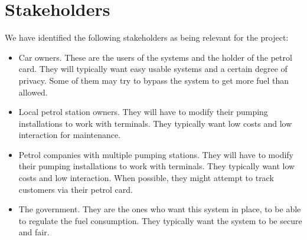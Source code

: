 \section{Stakeholders}
We have identified the following stakeholders as being relevant for the project:
\begin{itemize}
\item Car owners. These are the users of the systems and the holder of the petrol card.
They will typically want easy usable systems and a certain degree of privacy. 
Some of them may try to bypass the system to get more fuel than allowed.

\item Local petrol station owners. They will have to modify their pumping installations to 
work with terminals. They typically want low costs and low interaction for maintenance.

\item Petrol companies with multiple pumping stations. They will have to modify their
pumping installations to work with terminals. They typically want low costs and 
low interaction. When possible, they might attempt to track customers via their petrol card.

\item The government. They are the ones who want this system in place, to be able to regulate
the fuel consumption. They typically want the system to be secure and fair.
\end{itemize}

